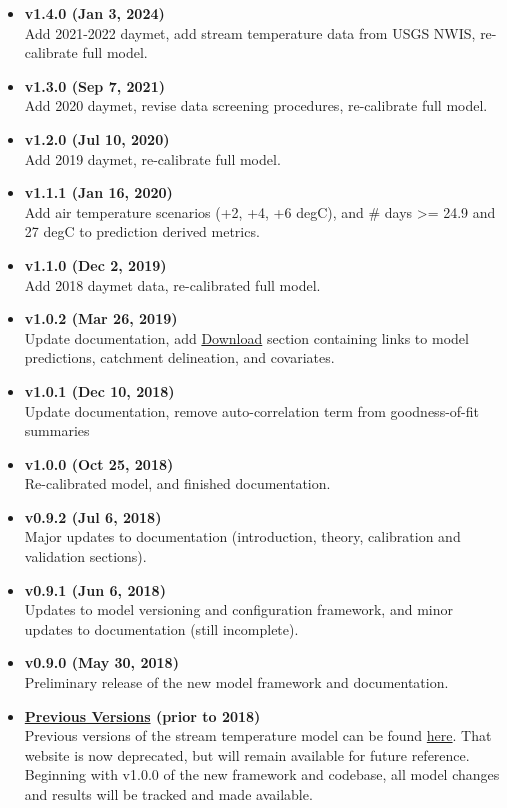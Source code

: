 \documentclass[
]{book}
\providecommand{\tightlist}{%
  \setlength{\itemsep}{0pt}\setlength{\parskip}{0pt}}
\begin{document}
\begin{itemize}
\tightlist
\item
  \textbf{v1.4.0 (Jan 3, 2024)}\\
  Add 2021-2022 daymet, add stream temperature data from USGS NWIS, re-calibrate full model.
\item
  \textbf{v1.3.0 (Sep 7, 2021)}\\
  Add 2020 daymet, revise data screening procedures, re-calibrate full model.
\item
  \textbf{v1.2.0 (Jul 10, 2020)}\\
  Add 2019 daymet, re-calibrate full model.
\item
  \textbf{v1.1.1 (Jan 16, 2020)}\\
  Add air temperature scenarios (+2, +4, +6 degC), and \# days \textgreater= 24.9 and 27 degC to prediction derived metrics.
\item
  \textbf{v1.1.0 (Dec 2, 2019)}\\
  Add 2018 daymet data, re-calibrated full model.
\item
  \textbf{v1.0.2 (Mar 26, 2019)}\\
  Update documentation, add \hyperref[download]{Download} section containing links to model predictions, catchment delineation, and covariates.
\item
  \textbf{v1.0.1 (Dec 10, 2018)}\\
  Update documentation, remove auto-correlation term from goodness-of-fit summaries
\item
  \textbf{v1.0.0 (Oct 25, 2018)}\\
  Re-calibrated model, and finished documentation.
\item
  \textbf{v0.9.2 (Jul 6, 2018)}\\
  Major updates to documentation (introduction, theory, calibration and validation sections).
\item
  \textbf{v0.9.1 (Jun 6, 2018)}\\
  Updates to model versioning and configuration framework, and minor updates to documentation (still incomplete).
\item
  \textbf{v0.9.0 (May 30, 2018)}\\
  Preliminary release of the new model framework and documentation.
\item
  \textbf{\href{https://conte-ecology.github.io/conteStreamTemperature_northeast/}{Previous Versions} (prior to 2018)}\\
  Previous versions of the stream temperature model can be found \href{https://conte-ecology.github.io/conteStreamTemperature_northeast/}{here}. That website is now deprecated, but will remain available for future reference. Beginning with v1.0.0 of the new framework and codebase, all model changes and results will be tracked and made available.
\end{itemize}
\end{document}
